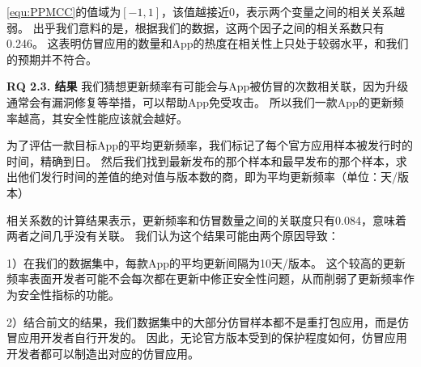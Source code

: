 \autoref{equ:PPMCC}的值域为$[-1, 1]$，该值越接近0，表示两个变量之间的相关关系越弱。
出乎我们意料的是，根据我们的数据，这两个因子之间的相关系数只有0.246。
这表明仿冒应用的数量和App的热度在相关性上只处于较弱水平，和我们的预期并不符合。

{\bf RQ 2.3. 结果}
我们猜想更新频率有可能会与App被仿冒的次数相关联，因为升级通常会有漏洞修复等举措，可以帮助App免受攻击。
所以我们一款App的更新频率越高，其安全性能应该就会越好。

为了评估一款目标App的平均更新频率，我们标记了每个官方应用样本被发行时的时间，精确到日。
然后我们找到最新发布的那个样本和最早发布的那个样本，求出他们发行时间的差值的绝对值与版本数的商，即为平均更新频率（单位：天/版本）

相关系数的计算结果表示，更新频率和仿冒数量之间的关联度只有0.084，意味着两者之间几乎没有关联。
我们认为这个结果可能由两个原因导致：

1）在我们的数据集中，每款App的平均更新间隔为10天/版本。
这个较高的更新频率表面开发者可能不会每次都在更新中修正安全性问题，从而削弱了更新频率作为安全性指标的功能。

2）结合前文的结果，我们数据集中的大部分仿冒样本都不是重打包应用，而是仿冒应用开发者自行开发的。
因此，无论官方版本受到的保护程度如何，仿冒应用开发者都可以制造出对应的仿冒应用。

